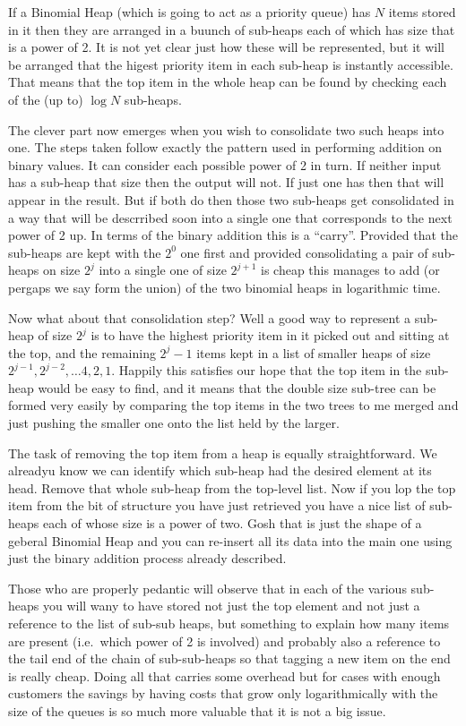 If a Binomial Heap (which is going to act as a priority queue) has
$N$ items stored in it then they are arranged in a buunch of
sub-heaps each of which has size that is a power of 2. It is not yet
clear just how these will be represented, but it will be arranged that the
higest priority item in each sub-heap is instantly accessible. That
means that the top item in the whole heap can be found by checking each
of the (up to) $\log N$ sub-heaps.

The clever part now emerges when you wish to consolidate two such
heaps into one. The steps taken follow exactly the pattern used in
performing addition on binary values. It can consider each possible
power of 2 in turn. If neither input has a sub-heap that size
then the output will not. If just one has then that will appear
in the result. But if both do then those two sub-heaps get
consolidated in a way that will be descrribed soon into a single
one that corresponds to the next power of 2 up. In terms of
the binary addition this is a ``carry''. Provided that the sub-heaps are
kept with the $2^0$ one first and provided consolidating a pair
of sub-heaps on size $2^j$ into a single one of size $2^{j+1}$ is
cheap this manages to add (or pergaps we say form the union) of the
two binomial heaps in logarithmic time.

Now what about that consolidation step? Well a good way to represent
a sub-heap of size $2^j$ is to have the highest priority item in it
picked out and sitting at the top, and the remaining $2^j - 1$ items
kept in a list of smaller heaps of size $2^{j-1}, 2^{j-2}, \ldots 4, 2, 1$.
Happily this satisfies our hope that the top item in the sub-heap would
be easy to find, and it means that the double size sub-tree can be
formed very easily by comparing the top items in the two
trees to me merged and just pushing the smaller one onto the
list held by the larger.

The task of removing the top item from a heap is equally straightforward.
We alreadyu know we can identify which sub-heap had the desired
element at its head. Remove that whole sub-heap from the top-level
list. Now if you lop the top item from the bit of structure you have
just retrieved you have a nice list of sub-heaps each of whose size
is a power of two. Gosh that is just the shape of a geberal Binomial
Heap and you can re-insert all its data into the main one using
just the binary addition process already described.

Those who are properly pedantic will observe that in each of the
various sub-heaps you will wany to have stored not just the top
element and not just a reference to the list of sub-sub heaps, but
something to explain how many items are present (i.e.\ which power of
2 is involved) and probably also a reference to the tail end of the
chain of sub-sub-heaps so that tagging a new item on the end is
really cheap. Doing all that carries some overhead but for cases with
enough customers the savings by having costs that grow only
logarithmically with the size of the queues is so much more valuable
that it is not a big issue.

